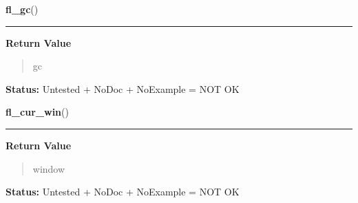     \vspace{0.5ex}

\hspace{.8\funcindent}\begin{boxedminipage}{\funcwidth}

    \raggedright \textbf{fl\_gc}()

    \vspace{-1.5ex}

    \rule{\textwidth}{0.5\fboxrule}
\setlength{\parskip}{2ex}
\setlength{\parskip}{1ex}
      \textbf{Return Value}
    \vspace{-1ex}

      \begin{quote}
      gc

      \end{quote}

\textbf{Status:} Untested + NoDoc + NoExample = NOT OK



    \end{boxedminipage}

    \label{xformslib:library:fl_cur_win_}

    \vspace{0.5ex}

\hspace{.8\funcindent}\begin{boxedminipage}{\funcwidth}

    \raggedright \textbf{fl\_cur\_win}()

    \vspace{-1.5ex}

    \rule{\textwidth}{0.5\fboxrule}
\setlength{\parskip}{2ex}
\setlength{\parskip}{1ex}
      \textbf{Return Value}
    \vspace{-1ex}

      \begin{quote}
      window

      \end{quote}

\textbf{Status:} Untested + NoDoc + NoExample = NOT OK



    \end{boxedminipage}

    \label{xformslib:library:fl_fheight_}

